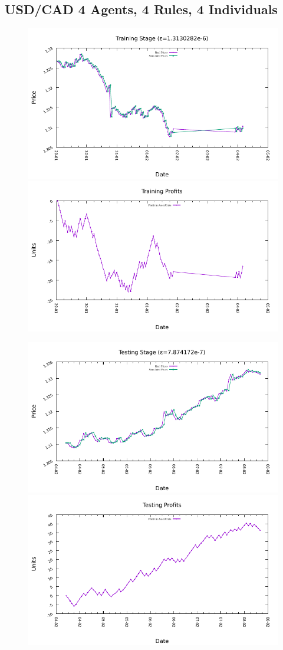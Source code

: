 








\subsection{USD/CAD 4 Agents, 4 Rules, 4 Individuals}
\label{results:forecast-usd-cad-4agents-4rules-4individuals}

\begin{figure}[htp]
\centering

\includegraphics[width=.45\textwidth]{img/plots/usd_cad_h1-4agents-4rules-4ind-100gen_training_fit.pdf}\quad
\includegraphics[width=.45\textwidth]{img/plots/usd_cad_h1-4agents-4rules-4ind-100gen_training_profits.pdf}

\medskip

\includegraphics[width=.45\textwidth]{img/plots/usd_cad_h1-4agents-4rules-4ind-100gen_testing_fit.pdf}\quad
\includegraphics[width=.45\textwidth]{img/plots/usd_cad_h1-4agents-4rules-4ind-100gen_testing_profits.pdf}


\end{figure}
